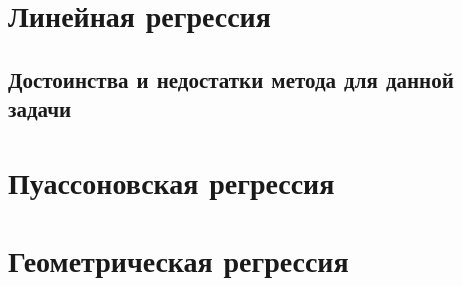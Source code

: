 \section{Линейная регрессия}
\subsection{Достоинства и недостатки метода для данной задачи}

\section{Пуассоновская регрессия}

\section{Геометрическая регрессия}